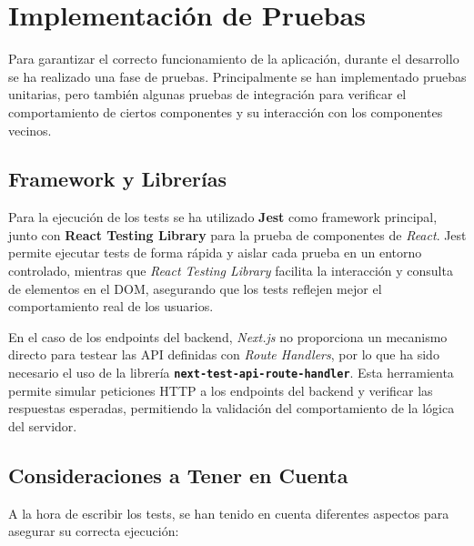 \section{Implementación de Pruebas}

Para garantizar el correcto funcionamiento de la aplicación, durante el desarrollo se ha realizado una fase de pruebas. Principalmente se han implementado pruebas unitarias, pero también algunas pruebas de integración para verificar el comportamiento de ciertos componentes y su interacción con los componentes vecinos.

\subsection{Framework y Librerías}

Para la ejecución de los tests se ha utilizado \textbf{Jest} como framework principal, junto con \textbf{React Testing Library} para la prueba de componentes de \textit{React}. Jest permite ejecutar tests de forma rápida y aislar cada prueba en un entorno controlado, mientras que \textit{React Testing Library} facilita la interacción y consulta de elementos en el DOM, asegurando que los tests reflejen mejor el comportamiento real de los usuarios.

En el caso de los endpoints del backend, \textit{Next.js} no proporciona un mecanismo directo para testear las API definidas con \textit{Route Handlers}, por lo que ha sido necesario el uso de la librería \textbf{\texttt{next-test-api-route-handler}}. Esta herramienta permite simular peticiones HTTP a los endpoints del backend y verificar las respuestas esperadas, permitiendo la validación del comportamiento de la lógica del servidor.

\subsection{Consideraciones a Tener en Cuenta}

A la hora de escribir los tests, se han tenido en cuenta diferentes aspectos para asegurar su correcta ejecución:

